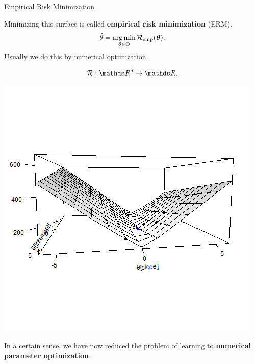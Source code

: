 \documentclass[11pt,compress,t,notes=noshow, xcolor=table]{beamer}
\begin{document}
\begin{vbframe}{Empirical Risk Minimization}
\framebreak

Minimizing this surface is called \textbf{empirical risk minimization} (ERM).
$$
\hat{\theta} = \operatorname*{arg\,min}_{\bm{\theta} \in \Theta} \mathcal{R}_{\text{emp}}(\bm{\theta}).
$$
Usually we do this by numerical optimization.

\begin{table}
\begin{minipage}{0.4\linewidth}
$$\risk : \R^d \to \R.$$
\end{minipage}\hfill
	\begin{minipage}{0.55\linewidth}
\includegraphics[trim=0 100 0 100,clip,width=\textwidth]{figure/ml-basic-riskmin-error-surface-best.png}
\end{minipage}
\end{table}

In a certain sense, we have now reduced the problem of learning to 
\textbf{numerical parameter optimization}.

\end{vbframe}
\end{document}
